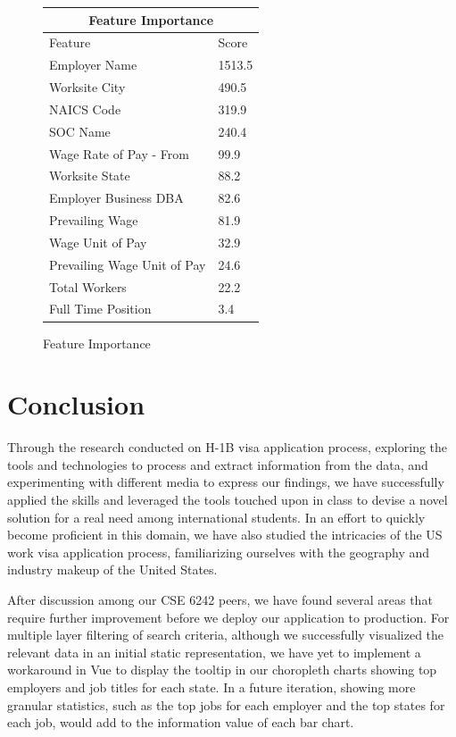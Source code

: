 \documentclass[sigconf]{acmart}
\begin{document}
\begin{figure}
  \begin{tabular}{ |p{4cm}||p{2cm}|  }
    \hline
    \multicolumn{2}{|c|}{\textbf{Feature Importance}} \\
    \hline
    Feature & Score\\
    \hline
    Employer Name & 1513.5\\
    Worksite City & 490.5\\
    NAICS Code & 319.9\\
    SOC Name & 240.4\\
    Wage Rate of Pay - From & 99.9\\
    Worksite State & 88.2\\
    Employer Business DBA & 82.6\\
    Prevailing Wage & 81.9\\
    Wage Unit of Pay & 32.9\\
    Prevailing Wage Unit of Pay & 24.6\\
    Total Workers & 22.2\\
    Full Time Position & 3.4\\
    \hline
   \end{tabular}
  \caption{Feature Importance}
   \label{fig:featureimportance}
\end{figure}


\section{Conclusion} 

Through the research conducted on H-1B visa application process, exploring the tools and technologies 
to process and extract information from the data, and experimenting with different media to 
express our findings, we have successfully applied the skills and leveraged the tools touched 
upon in class to devise a novel solution for a real need among international students. 
In an effort to quickly become proficient in this domain, we have also studied 
the intricacies of the US work visa application process, familiarizing ourselves 
with the geography and industry makeup of the United States. 

After discussion among our CSE 6242 peers, we have found several areas that require further 
improvement before we deploy our application to production. 
For multiple layer filtering of search criteria, although we successfully visualized the 
relevant data in an initial static representation, we have yet to implement a workaround 
in Vue to display the tooltip in our choropleth charts showing top employers 
and job titles for each state. In a future iteration, showing more granular statistics, 
such as the top jobs for each employer and the top states for each job, would add to 
the information value of each bar chart. 
\end{document}
